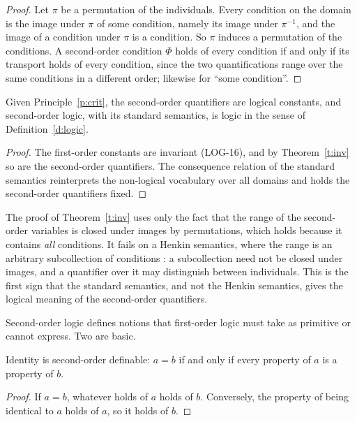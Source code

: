\documentclass{situationist-preprint}
\begin{document}
\begin{proof}
Let $\pi$ be a permutation of the individuals. Every condition on the domain is the image under $\pi$ of some condition, namely its image under $\pi^{-1}$, and the image of a condition under $\pi$ is a condition. So $\pi$ induces a permutation of the conditions. A second-order condition $\Phi$ holds of every condition if and only if its transport holds of every condition, since the two quantifications range over the same conditions in a different order; likewise for \enquote{some condition}.
\end{proof}

\begin{corollary}\label{c:logical}
Given Principle~\ref{p:crit}, the second-order quantifiers are logical constants, and second-order logic, with its standard semantics, is logic in the sense of Definition~\ref{d:logic}.
\end{corollary}

\begin{proof}
The first-order constants are invariant (LOG-16), and by Theorem~\ref{t:inv} so are the second-order quantifiers. The consequence relation of the standard semantics reinterprets the non-logical vocabulary over all domains and holds the second-order quantifiers fixed.
\end{proof}

The proof of Theorem~\ref{t:inv} uses only the fact that the range of the second-order variables is closed under images by permutations, which holds because it contains \emph{all} conditions. It fails on a Henkin semantics, where the range is an arbitrary subcollection of conditions \citep{Henkin1950}: a subcollection need not be closed under images, and a quantifier over it may distinguish between individuals. This is the first sign that the standard semantics, and not the Henkin semantics, gives the logical meaning of the second-order quantifiers.

Second-order logic defines notions that first-order logic must take as primitive or cannot express. Two are basic.

\begin{proposition}[Leibniz]\label{p:leibniz}
Identity is second-order definable: $a = b$ if and only if every property of $a$ is a property of $b$.
\end{proposition}

\begin{proof}
If $a = b$, whatever holds of $a$ holds of $b$. Conversely, the property of being identical to $a$ holds of $a$, so it holds of $b$.
\end{proof}
\end{document}

